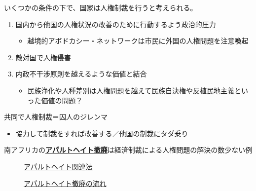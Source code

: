 \documentclass[
  xelatex,
  ja=standard]{bxjsarticle}
\providecommand{\tightlist}{%
  \setlength{\itemsep}{0pt}\setlength{\parskip}{0pt}}\usepackage{longtable,booktabs,array}
\begin{document}
いくつかの条件の下で、国家は人権制裁を行うと考えられる。

\begin{enumerate}
\def\labelenumi{\arabic{enumi}.}
\tightlist
\item
  国内から他国の人権状況の改善のために行動するよう政治的圧力

  \begin{itemize}
  \tightlist
  \item
    越境的アボドカシー・ネットワークは市民に外国の人権問題を注意喚起
  \end{itemize}
\item
  敵対国で人権侵害
\item
  内政不干渉原則を越えるような価値と結合

  \begin{itemize}
  \tightlist
  \item
    民族浄化や人種差別は人権問題を越えて民族自決権や反植民地主義といった価値の問題？
  \end{itemize}
\end{enumerate}

共同で人権制裁＝囚人のジレンマ

\begin{itemize}
\tightlist
\item
  協力して制裁をすれば改善する／他国の制裁にタダ乗り
\end{itemize}

南アフリカの\href{https://www.unic.or.jp/activities/humanrights/discrimination/apartheid/}{\textbf{アパルトヘイト撤廃}}は経済制裁による人権問題の解決の数少ない例

\begin{figure}

\begin{minipage}[t]{0.50\linewidth}

{\centering 


\caption{\href{https://www.mofa.go.jp/mofaj/press/pr/wakaru/topics/vol49/index.html}{アパルトヘイト関連法}}

}

\end{minipage}%
%
\begin{minipage}[t]{0.50\linewidth}

{\centering 


\caption{\href{https://www.mofa.go.jp/mofaj/press/pr/wakaru/topics/vol49/index.html}{アパルトヘイト撤廃の流れ}}

}

\end{minipage}%

\end{figure}
\end{document}
